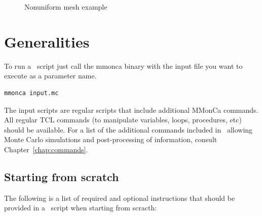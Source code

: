 \begin{figure}[!htb]
  \centering
  \caption{\label{fig-nonuniform-mesh} Nonuniform mesh example}
\end{figure}

\section{Generalities}

To run a \MMonCa\ script just call the {\param mmonca} binary with the input file you want to execute as a parameter name.

\begin{lstlisting}
mmonca input.mc
\end{lstlisting}

The input scripts are regular  scripts that include additional MMonCa commands. All regular TCL commands (to manipulate variables, loops, procedures, etc) should be available. For a list of the additional commands included in \MMonCa\ allowing Monte Carlo simulations and post-processing of information, consult Chapter~\ref{chap:commands}.

\subsection{Starting from scratch}

The following is a list of required and optional instructions that should be provided in a \MMonCa\ script when starting from scracth:

